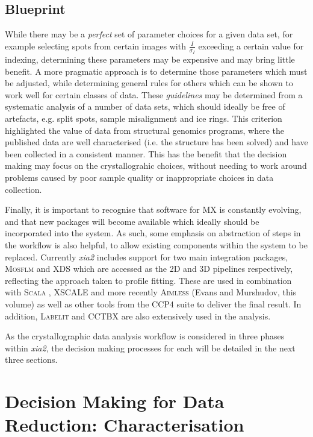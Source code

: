 \documentclass[a4paper, 11pt]{article}
\begin{document}
\subsection{Blueprint}

While there may be a \emph{perfect} set of parameter choices for a
given data set, for example selecting spots from certain images with
$\frac{I}{\sigma_I}$ exceeding a certain value for indexing,
determining these parameters may be expensive and may bring little
benefit. A more pragmatic approach is to determine those parameters
which must be adjusted, while determining general rules for others
which can be shown to work well for certain classes of data.
These \emph{guidelines} may be determined from a systematic
analysis of a number of data sets, which should ideally be free of
artefacts, e.g. split spots, sample misalignment and ice rings. 
This criterion highlighted the value of data from 
structural genomics programs, where the published data are well
characterised (i.e. the structure has been solved) and have been
collected in a consistent manner. This has the benefit that the
decision making may focus on the crystallograhic choices, without
needing to work around problems caused by poor sample quality or
inappropriate choices in data collection. 

Finally, it is important to recognise that software for MX is
constantly evolving, and that new packages will become available which
ideally should be incorporated into the system. As such, some emphasis
on abstraction of steps in the workflow is also helpful, to allow
existing components within the system to be replaced. Currently \emph{xia2} 
includes support for two main integration packages, \textsc{Mosflm}
\cite{leslie1992rcm} and XDS \cite{Kabsch:dz5179}
which are accessed as the 2D and 3D
pipelines respectively, reflecting the approach taken to profile
fitting. These are used in combination with \textsc{Scala} \cite{Evans:ba5084}, XSCALE
and more recently \textsc{Aimless} (Evans and Murshudov, this volume) as well
as other
tools from the CCP4 suite to deliver the final result. In
addition, \textsc{Labelit} \cite{Sauter:dd5008} and CCTBX
\cite{Grosse-Kunstleve:ks0118} are also 
extensively used in the analysis.

As the crystallographic data analysis workflow is considered in three
phases within \emph{xia2}, the decision making processes for each will
be detailed in the next three sections.

\section{Decision Making for Data Reduction: Characterisation}
\end{document}
